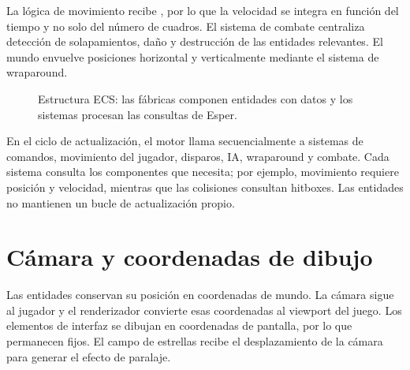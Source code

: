 \documentclass[12pt,letterpaper]{report}
\newcommand{\archivo}[1]{\texttt{\detokenize{#1}}}
\begin{document}
La lógica de movimiento recibe \archivo{delta_time}, por lo que la velocidad se integra en función del tiempo y no solo del número de cuadros. El sistema de combate centraliza detección de solapamientos, daño y destrucción de las entidades relevantes. El mundo envuelve posiciones horizontal y verticalmente mediante el sistema de wraparound.

\begin{figure}[htbp]
\centering
{}
\caption{Estructura ECS: las fábricas componen entidades con datos y los sistemas procesan las consultas de Esper.}
\end{figure}

En el ciclo de actualización, el motor llama secuencialmente a sistemas de comandos, movimiento del jugador, disparos, IA, wraparound y combate. Cada sistema consulta los componentes que necesita; por ejemplo, movimiento requiere posición y velocidad, mientras que las colisiones consultan hitboxes. Las entidades no mantienen un bucle de actualización propio.

\section{Cámara y coordenadas de dibujo}
Las entidades conservan su posición en coordenadas de mundo. La cámara sigue al jugador y el renderizador convierte esas coordenadas al viewport del juego. Los elementos de interfaz se dibujan en coordenadas de pantalla, por lo que permanecen fijos. El campo de estrellas recibe el desplazamiento de la cámara para generar el efecto de paralaje.
\end{document}
